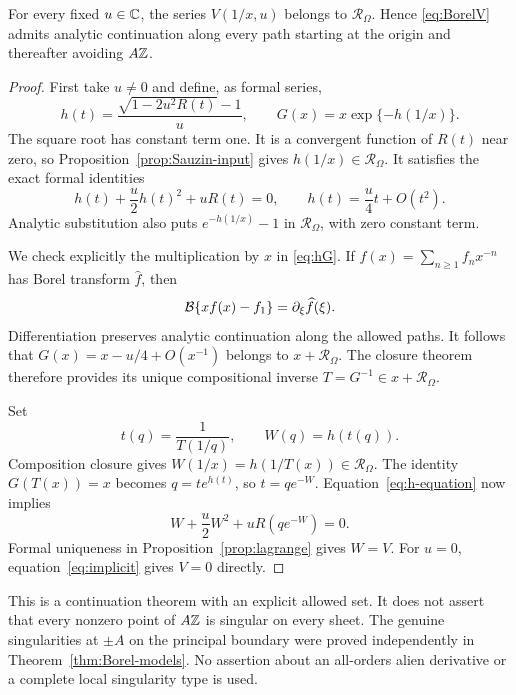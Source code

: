 \begin{theorem}
\label{thm:inverse-continuation}
For every fixed $u\in\mathbb C$, the series $V(1/x,u)$ belongs to
$\mathcal R_\Omega$. Hence \eqref{eq:BorelV} admits analytic continuation
along every path starting at the origin and thereafter avoiding $A\mathbb Z$.
\end{theorem}
\begin{proof}
First take $u\ne0$ and define, as formal series,
\begin{equation}\label{eq:hG}
 h(t)=\frac{\sqrt{1-2u^2R(t)}-1}{u},
 \qquad
 G(x)=x\exp\{-h(1/x)\}.
\end{equation}
The square root has constant term one. It is a convergent function of
$R(t)$ near zero, so Proposition~\ref{prop:Sauzin-input} gives
$h(1/x)\in\mathcal R_\Omega$. It satisfies the exact formal identities
\begin{equation}\label{eq:h-equation}
 h(t)+\frac u2 h(t)^2+uR(t)=0,\qquad
 h(t)=\frac u4t+O(t^2).
\end{equation}
Analytic substitution also puts $e^{-h(1/x)}-1$ in
$\mathcal R_\Omega$, with zero constant term.

We check explicitly the multiplication by $x$ in \eqref{eq:hG}.
If $f(x)=\sum_{n\ge1}f_nx^{-n}$ has Borel transform $\widehat f$, then
\[
 \mathcal B\{xf(x)-f_1\}=\partial_\xi\widehat f(\xi).
\]
Differentiation preserves analytic continuation along the allowed paths.
It follows that
$G(x)=x-u/4+O(x^{-1})$ belongs to $x+\mathcal R_\Omega$.
The closure theorem therefore provides its unique compositional inverse
$T=G^{-1}\in x+\mathcal R_\Omega$.

Set
\begin{equation}\label{eq:inverse-parametrization}
 t(q)=\frac1{T(1/q)},\qquad W(q)=h(t(q)).
\end{equation}
Composition closure gives $W(1/x)=h(1/T(x))\in\mathcal R_\Omega$.
The identity $G(T(x))=x$ becomes $q=t e^{h(t)}$, so
$t=qe^{-W}$. Equation~\eqref{eq:h-equation} now implies
\[
 W+\frac u2W^2+uR(qe^{-W})=0.
\]
Formal uniqueness in Proposition~\ref{prop:lagrange} gives $W=V$.
For $u=0$, equation~\eqref{eq:implicit} gives $V=0$ directly.
\end{proof}

This is a continuation theorem with an explicit allowed set. It does not
assert that every nonzero point of $A\mathbb Z$ is singular on every sheet.
The genuine singularities at $\pm A$ on the principal boundary were proved
independently in Theorem~\ref{thm:Borel-models}. No assertion about an
all-orders alien derivative or a complete local singularity type is used.

